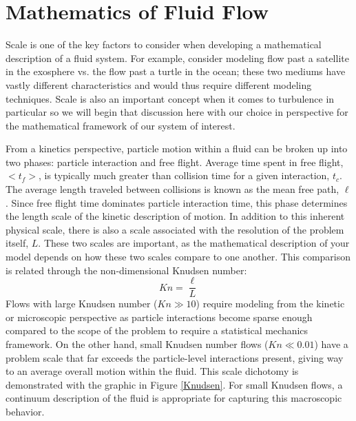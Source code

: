 \section{Mathematics of Fluid Flow}

Scale is one of the key factors to consider when developing a mathematical description of a fluid system. For example, consider modeling flow past a satellite in the exosphere vs. the flow past a turtle in the ocean; these two mediums have vastly different characteristics and would thus require different modeling techniques. Scale is also an important concept when it comes to turbulence in particular so we will begin that discussion here with our choice in perspective for the mathematical framework of our system of interest.

From a kinetics perspective, particle motion within a fluid can be broken up into two phases: particle interaction and free flight. Average time spent in free flight, $<t_f>$, is typically much greater than collision time for a given interaction, $t_c$. The average length traveled between collisions is known as the mean free path, $\ell$.  Since free flight time dominates particle interaction time, this phase determines the length scale of the kinetic description of motion. In addition to this inherent physical scale, there is also a scale associated with the resolution of the problem itself, $L$. These two scales are important, as the mathematical description of your model depends on how these two scales compare to one another. This comparison is related through the non-dimensional Knudsen number: 
\begin{equation}\label{Knudsen}
Kn = \dfrac{\ell}{L}
\end{equation} 
Flows with large Knudsen number ($Kn \gg 10$) require modeling from the kinetic or microscopic perspective as particle interactions become sparse enough compared to the scope of the problem to require a statistical mechanics framework. On the other hand, small Knudsen number flows ($Kn \ll 0.01$) have a problem scale that far exceeds the particle-level interactions present, giving way to an average overall motion within the fluid. This scale dichotomy is demonstrated with the graphic in Figure \ref{Knudsen}. For small Knudsen flows, a continuum description of the fluid is appropriate for capturing this macroscopic behavior. 

